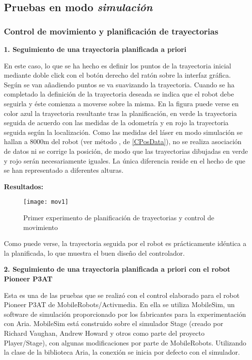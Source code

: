 \subsection{Pruebas en modo \emph{simulación}}

\subsubsection{Control de movimiento y planificación de trayectorias}

\noindent
\textbf{\textbf{1.} Seguimiento de una trayectoria planificada a priori}

En este caso, lo que se ha hecho es definir los puntos de la trayectoria inicial mediante doble click con el botón derecho del ratón sobre la interfaz gráfica. Según se van añadiendo puntos se va suavizando la trayectoria. Cuando se ha completado la definición de la trayectoria deseada se indica que el robot debe seguirla y éste comienza a moverse sobre la misma. En la figura puede verse en color azul la trayectoria resultante tras la planificación, en verde la trayectoria seguida de acuerdo con las medidas de la odometría y en rojo la trayectoria seguida según la localización. Como las medidas del láser en modo simulación se hallan a 8000m del robot (ver método , de \ref{CPosData}), no se realiza asociación de datos ni se corrige la posición, de modo que las trayectorias dibujadas en verde y rojo serán necesariamente iguales. La única diferencia reside en el hecho de que se han representado a diferentes alturas.


\textbf{Resultados:}
\begin{figure}[h]
  \centering\texttt{[image: mov1]}\\
  \caption{Primer experimento de planificación de trayectorias y control de movimiento}\label{fg:mov1}
\end{figure}

Como puede verse, la trayectoria seguida por el robot es prácticamente idéntica a la planificada, lo que muestra el buen diseño del controlador.

\noindent
\textbf{\textbf{2.} Seguimiento de una trayectoria planificada a priori con el robot Pioneer P3AT}

Esta es una de las pruebas que se realizó con el control elaborado para el robot Pioneer P3AT de MobileRobots/Activmedia. En ella se utiliza MobileSim, un software de simulación proporcionado por los fabricantes para la experimentación con Aria. MobileSim está construido sobre el simulador Stage (creado por Richard Vaughan, Andrew Howard y otros como parte del proyecto Player/Stage), con algunas modificaciones por parte de MobileRobots. Utilizando la clase  de la biblioteca Aria, la conexión se inicia por defecto con el simulador.


